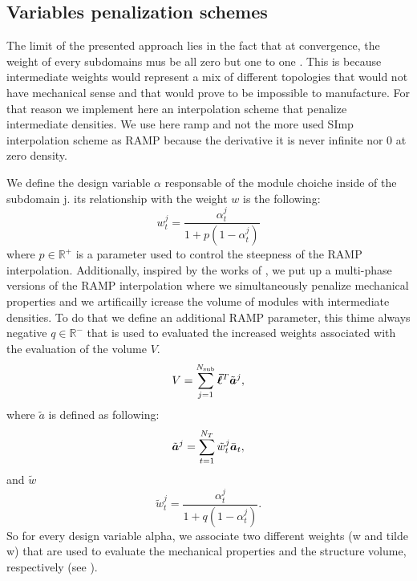 \subsection{Variables penalization schemes}
The limit of the presented approach lies in the fact that at convergence, the weight of every subdomains mus be all zero but one to one . This is because intermediate weights would represent a mix of different topologies that would not have mechanical sense and that would prove to be impossible to manufacture. For that reason we implement here an interpolation scheme that penalize intermediate densities. We use here \gls{ramp}  and not the more used SImp interpolation scheme as RAMP because the derivative it is never infinite nor 0 at zero density.

We define the design variable $\alpha$ responsable of the module choiche inside of the subdomain j. its relationship with the weight $w$ is the following: 
\begin{equation}
    w_t^j = \frac{\alpha_t^j}{1+p(1-\alpha_t^j)}    
\end{equation}
where $p\in \mathbb{R}^+$ is a parameter used to control the steepness of the RAMP interpolation. Additionally, inspired by the works of , we put up a multi-phase versions of the RAMP interpolation where we simultaneously penalize mechanical properties and we artificailly icrease the volume of modules with intermediate densities. To do that we define an additional RAMP parameter, this thime always negative $q\in \mathbb{R}^-$ that is used to evaluated the increased weights associated with the evaluation of the volume $V$.
\begin{equation}
    V = \sum_{j=1}^{N_{\text{sub}}}\bm{\bar{\ell}}^T\tilde{\bm{a}}^j,
\end{equation}
where $\tilde{a}$ is defined as following:
\begin{equation}
    \tilde{\bm{a}}^j = \sum_{t=1}^{N_T} \tilde{w}_t^j \bar{\bm{a}}_t, 
\end{equation}
and $\tilde{w}$
\begin{equation}
    \tilde{w}_t^j = \frac{\alpha_t^j}{1+q(1-\alpha_t^j)}.    
\end{equation}
So for every design variable alpha, we associate two different weights (w and tilde w) that are used to evaluate the mechanical properties and the structure volume, respectively (see ).

